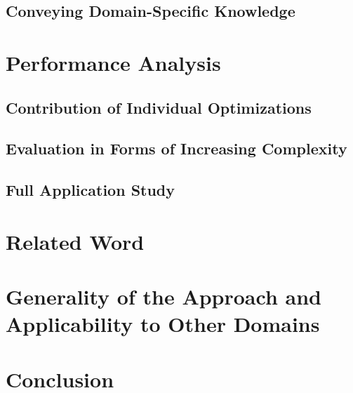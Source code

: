 \subsection{Conveying Domain-Specific Knowledge}

\section{Performance Analysis}
\subsection{Contribution of Individual Optimizations}
\subsection{Evaluation in Forms of Increasing Complexity}
\subsection{Full Application Study}


\section{Related Word}
\label{sec:coffee-related-work}

\section{Generality of the Approach and Applicability to Other Domains}
\label{sec:generality}

\section{Conclusion}